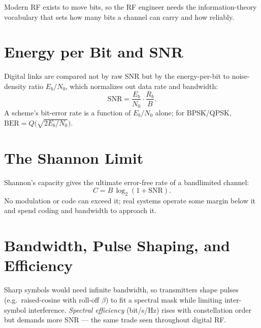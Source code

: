 Modern RF exists to move bits, so the RF engineer needs the information-theory
vocabulary that sets how many bits a channel can carry and how reliably.

\section{Energy per Bit and SNR}
Digital links are compared not by raw SNR but by the energy-per-bit to
noise-density ratio $E_b/N_0$, which normalizes out data rate and bandwidth:
\[ \text{SNR} = \frac{E_b}{N_0}\cdot\frac{R_b}{B}. \]
A scheme's bit-error rate is a function of $E_b/N_0$ alone; for BPSK/QPSK,
$\text{BER} = Q\!\big(\sqrt{2E_b/N_0}\big)$.

\section{The Shannon Limit}
Shannon's capacity gives the ultimate error-free rate of a bandlimited channel:
\[ C = B\,\log_2(1 + \text{SNR}). \]
No modulation or code can exceed it; real systems operate some margin below it and
spend coding and bandwidth to approach it.

\section{Bandwidth, Pulse Shaping, and Efficiency}
Sharp symbols would need infinite bandwidth, so transmitters shape pulses (e.g.\
raised-cosine with roll-off $\beta$) to fit a spectral mask while limiting
inter-symbol interference. \emph{Spectral efficiency} (bit/s/Hz) rises with
constellation order but demands more SNR --- the same trade seen throughout digital
RF.

